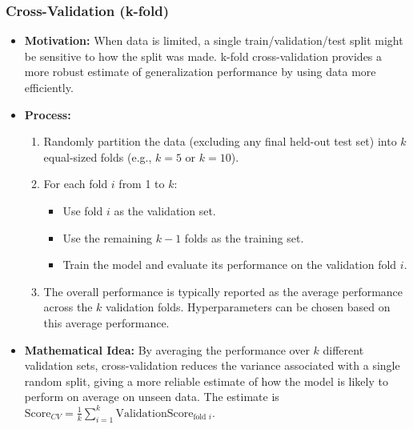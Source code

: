 \documentclass{article}
\begin{document}
\subsubsection{Cross-Validation (k-fold)}
\begin{itemize}
    \item \textbf{Motivation:} When data is limited, a single train/validation/test split might be sensitive to how the split was made. k-fold cross-validation provides a more robust estimate of generalization performance by using data more efficiently.
    \item \textbf{Process:}
        \begin{enumerate}
            \item Randomly partition the data (excluding any final held-out test set) into $k$ equal-sized folds (e.g., $k=5$ or $k=10$).
            \item For each fold $i$ from 1 to $k$:
                \begin{itemize}
                    \item Use fold $i$ as the validation set.
                    \item Use the remaining $k-1$ folds as the training set.
                    \item Train the model and evaluate its performance on the validation fold $i$.
                \end{itemize}
            \item The overall performance is typically reported as the average performance across the $k$ validation folds. Hyperparameters can be chosen based on this average performance.
        \end{enumerate}
    \item \textbf{Mathematical Idea:} By averaging the performance over $k$ different validation sets, cross-validation reduces the variance associated with a single random split, giving a more reliable estimate of how the model is likely to perform on average on unseen data. The estimate is $\text{Score}_{CV} = \frac{1}{k} \sum_{i=1}^k \text{ValidationScore}_{\text{fold } i}$.
\end{itemize}
\end{document}
